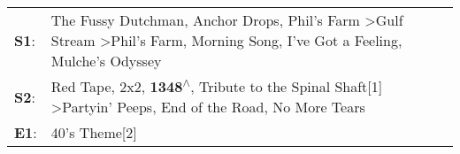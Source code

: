 \begin{supertabular}{p{0.03\textwidth}p{0.92\textwidth}}
 \textbf{S1}:  &  The Fussy Dutchman\textsuperscript{}, \enspace Anchor Drops\textsuperscript{}, \enspace Phil's Farm\textsuperscript{} \textgreater \enspace Gulf Stream\textsuperscript{} \textgreater \enspace Phil's Farm\textsuperscript{}, \enspace Morning Song\textsuperscript{}, \enspace I've Got a Feeling\textsuperscript{}, \enspace Mulche's Odyssey\textsuperscript{}  \enspace  \\
 \textbf{S2}:  &                                                Red Tape\textsuperscript{}, \enspace 2x2\textsuperscript{}, \enspace \textbf{1348\textsuperscript{$\wedge$}}, \enspace Tribute to the Spinal Shaft[1]\textsuperscript{} \textgreater \enspace Partyin' Peeps\textsuperscript{}, \enspace End of the Road\textsuperscript{}, \enspace No More Tears\textsuperscript{}  \enspace  \\
 \textbf{E1}:  &                                                                                                                                                                                                                                                                                                                                     40's Theme[2]\textsuperscript{}  \enspace  \\
\end{supertabular}
